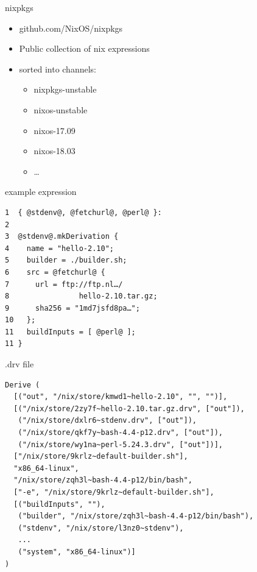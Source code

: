 \documentclass[aspectratio=169]{beamer}
\begin{document}
\begin{frame}[label=nixpkgs]{nixpkgs}
    \begin{itemize}
        \item github.com/NixOS/nixpkgs
        \item Public collection of nix expressions
        \item sorted into channels:
            \begin{itemize}
                \item nixpkgs-unstable
                \item nixos-unstable
                \item nixos-17.09
                \item nixos-18.03
                \item …
            \end{itemize}
    \end{itemize}
\end{frame}

\begin{frame}[fragile,label=eexpr]{example expression}
    \small
\begin{lstlisting}[style=base,breaklines=false]
1  { @stdenv@, @fetchurl@, @perl@ }:
2
3  @stdenv@.mkDerivation {
4    name = "hello-2.10";
5    builder = ./builder.sh;
6    src = @fetchurl@ {
7      url = ftp://ftp.nl…/
8                hello-2.10.tar.gz;
9      sha256 = "1md7jsfd8pa…";
10   };
11   buildInputs = [ @perl@ ];
11 }
\end{lstlisting}
\end{frame}

\begin{frame}[fragile]{.drv file}
    \footnotesize
\begin{lstlisting}[style=base,breaklines=false]
Derive (
  [("out", "/nix/store/kmwd1~hello-2.10", "", "")],
  [("/nix/store/2zy7f~hello-2.10.tar.gz.drv", ["out"]),
   ("/nix/store/dxlr6~stdenv.drv", ["out"]),
   ("/nix/store/qkf7y~bash-4.4-p12.drv", ["out"]),
   ("/nix/store/wy1na~perl-5.24.3.drv", ["out"])],
  ["/nix/store/9krlz~default-builder.sh"],
  "x86_64-linux",
  "/nix/store/zqh3l~bash-4.4-p12/bin/bash",
  ["-e", "/nix/store/9krlz~default-builder.sh"],
  [("buildInputs", ""),
   ("builder", "/nix/store/zqh3l~bash-4.4-p12/bin/bash"),
   ("stdenv", "/nix/store/l3nz0~stdenv"),
   ...
   ("system", "x86_64-linux")]
)
\end{lstlisting}
\end{frame}
\end{document}
